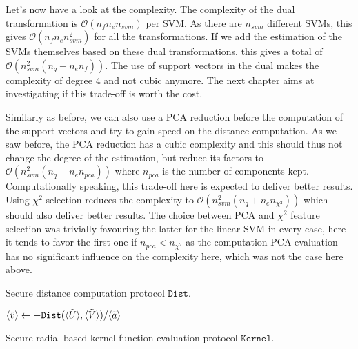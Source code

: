 Let's now have a look at the complexity. The complexity of the dual transformation is $\mathcal{O}(n_fn_en_{svm})$ per SVM. As there are $n_{svm}$ different SVMs, this gives $\mathcal{O}(n_fn_en_{svm}^2)$ for all the transformations. If we add the estimation of the SVMs themselves based on these dual transformations, this gives a total of $\mathcal{O}(n_{svm}^2(n_q+n_en_f))$. The use of support vectors in the dual makes the complexity of degree 4 and not cubic anymore. The next chapter aims at investigating if this trade-off is worth the cost.

Similarly as before, we can also use a PCA reduction before the computation of the support vectors and try to gain speed on the distance computation. As we saw before, the PCA reduction has a cubic complexity and this should thus not change the degree of the estimation, but reduce its factors to $\mathcal{O}(n_{svm}^2(n_q+n_en_{pca}))$ where $n_{pca}$ is the number of components kept. Computationally speaking, this trade-off here is expected to deliver better results. Using $\chi^2$ selection reduces the complexity to $\mathcal{O}(n_{svm}^2(n_q+n_en_{\chi^2}))$ which should also deliver better results. The choice between PCA and $\chi^2$ feature selection was trivially favouring the latter for the linear SVM in every case, here it tends to favor the first one if $n_{pca}<n_{\chi^2}$ as the computation PCA evaluation has no significant influence on the complexity here, which was not the case here above.

\begin{center}
\begin{algorithm}[H]
\DontPrintSemicolon
{}
\caption{Secure distance computation protocol $\mathtt{Dist}$.}
\label{alg:sec-dist}
\end{algorithm}
\end{center}

\begin{center}
\begin{algorithm}[H]
\DontPrintSemicolon
$\langle \tilde{v} \rangle \leftarrow - \mathtt{Dist}(\langle \tilde{U} \rangle,\langle \tilde{V} \rangle) / \langle \tilde{a} \rangle$ \;
\caption{Secure radial based kernel function evaluation protocol $\mathtt{Kernel}$.}
\label{alg:sec-kernel}
\end{algorithm}
\end{center}

